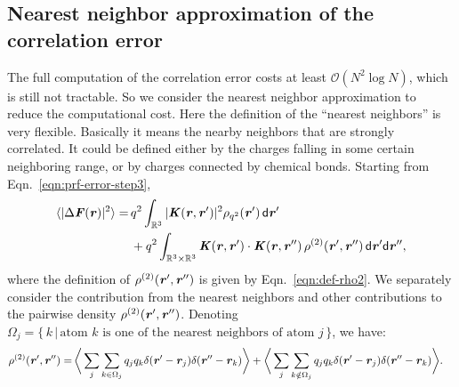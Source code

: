 \documentclass[aps,pre,preprint,unsortedaddress]{revtex4}
\newcommand{\recheck}[1]{{\color{red} #1}}
\newcommand{\redc}[1]{{\color{red} #1}}
\renewcommand{\v}[1]{\textbf{\textit{#1}}}
\renewcommand{\d}[1]{\textsf{#1}}
\begin{document}
\subsection{Nearest neighbor approximation of the correlation
error}
The full computation of the correlation error costs at least $\mathcal
O(N^2\log N)$, which is still not \redc{tractable}.
So we consider the nearest neighbor approximation to reduce
the computational cost.
Here the definition of the ``nearest neighbors'' is
very flexible. Basically it means the nearby neighbors that are
strongly correlated. It could be defined \recheck{either}
by the charges falling in some
certain neighboring range, or \recheck{by} charges connected by chemical bonds.
Starting from Eqn.~\eqref{eqn:prf-error-step3},
\begin{align} \nonumber
  \langle\vert\Delta\v F(\v r)\vert^2\rangle
  =\,&
  q^2\int_{\mathbb R^3}
  \vert\v K(\v r , \v r')\vert^2\rho_{q^2}(\v r')\,\d d\v r'
  \\\label{eqn:start-corr}
  & +
  q^2\int_{\mathbb R^3\times\mathbb R^3}
  \v K(\v r , \v r')\cdot\v K(\v r , \v r'')\,
  \rho^{(2)}(\v r', \v r'')
  \,\d d\v r'\d d\v r'',
\end{align}
where the definition of $\rho^{(2)}(\v r', \v r'')$ is given by
Eqn.~\eqref{eqn:def-rho2}.
We separately consider the  contribution from the nearest neighbors
and other contributions to
the pairwise density $\rho^{(2)}(\v r', \v r'')$.  Denoting
$\Omega_j = \{ \,k\,\vert\,
\textrm{atom $k$ is one of the nearest neighbors of atom $j$} \,\}$,
we have:
\begin{align}\label{eqn:split-rho-q2}
  \rho^{(2)}(\v r', \v r'')
  = &\,
  \bigg\langle
  \sum_j\sum_{k\in\Omega_j}q_j q_k\delta(\v r' - \v r_j)\delta(\v r'' - \v r_k)
  \bigg\rangle
  +
  \bigg\langle
  \sum_j\sum_{k\notin\Omega_j}q_j q_k\delta(\v r' - \v r_j)\delta(\v r'' - \v r_k)
  \bigg\rangle.
\end{align}
\end{document}
